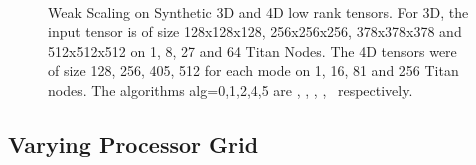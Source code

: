 \begin{figure}
\\
\caption {Weak Scaling on Synthetic 3D and 4D low rank tensors. For 3D, the input tensor is of size 128x128x128, 256x256x256, 378x378x378 and 512x512x512 on 1, 8, 27 and 64 Titan Nodes. The 4D tensors were of size 128, 256, 405, 512 for each mode on 1, 16, 81 and 256 Titan nodes.  The algorithms alg=0,1,2,4,5 are \MU, \HALS, \BPP, \ADMM, \Nestrov\ respectively.}
\label{fig:synweakscaling}
\end{figure}



\subsection{Varying Processor Grid}

